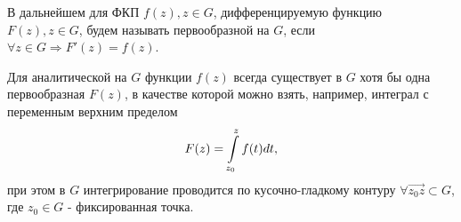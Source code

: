 
\begin{col-answer-preambule}
\end{col-answer-preambule}
В дальнейшем для ФКП $f(z), z \in G$, дифференцируемую функцию $F(z), z \in G$, будем называть
первообразной на $G$, если $\forall z \in G \Rightarrow F'(z) = f(z)$.

\begin{theorem}
  Для аналитической на $G$ функции $f(z)$ всегда существует в $G$ хотя бы одна первообразная
  $F(z)$, в качестве которой можно взять, например, интеграл с переменным верхним пределом
  \begin{equation}
    \label{eq:lecture16-06}
    F(z) = \int\limits_{z_0}^{z}f(t)dt,
  \end{equation}
  при этом в $G$ интегрирование проводится по кусочно-гладкому контуру
  $\forall \overrightarrow{z_0z} \subset G$, где $z_0 \in G$ - фиксированная точка.
\end{theorem}
